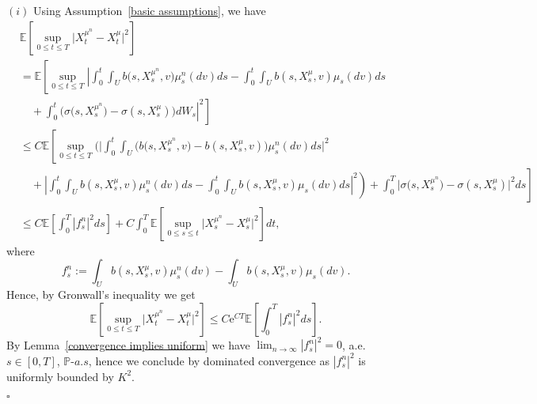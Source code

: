 \documentclass[12pt]{article}
\theoremstyle{named}
\numberwithin{equation}{section}
\def\P{{\mathord{\mathbb P}}}
\newcommand{\re}{\mathrm{e}}
\newenvironment{Proof}{\removelastskip\par\medskip \noindent{\em Proof.} \rm}{\penalty-20\null\hfill$\square$\par\medbreak}
\begin{document}
\begin{Proof}
 \noindent
 $(i)$
 Using
Assumption~\ref{basic assumptions}, we have
\begin{align*}
  &\mathbb{E}\left[ \sup\limits_{0 \leq t \leq T} \big|X^{{\mu}^n }_t - X^{{\mu}}_t\big|^2\right]
  \\
  &= \mathbb{E}\left[ \sup\limits_{0 \leq t \leq T}
    \left| \int_0^t \int_U b\big(s,X^{{\mu}^n }_s,v\big) {\mu}^n_s(dv) ds - \int_0^t \int_U b(s,X^{{\mu}}_s,v) {\mu}_s(dv) ds
      \right. \right.
      \\
      &\left.\left.
\quad       + \int_0^t \big( \sigma\big(s,X^{{\mu}^n }_s\big) - \sigma(s,X^{{\mu}}_s) \big) dW_s\right|^2\right] \\
  &\leq C \mathbb{E} \left[
    \sup\limits_{0 \leq t \leq T}\bigg(\bigg| \int_0^t \int_U \bigl( b\big(s,X^{{\mu}^n }_s,v\big) - b(s,X^{{\mu}}_s,v) \bigr) {\mu}^n _s(dv) ds\bigg|^2
    \right.
    \\
    &\left. \left.
    \quad + \left| \int_0^t \int_U b(s,X^{{\mu}}_s,v) {\mu}^n_s(dv) ds - \int_0^t \int_U b(s,X^{{\mu}}_s,v) {\mu}_s(dv) ds\right|^2\right)
    + \int_0^T \big| \sigma\big(s,X^{{\mu}^n }_s\big)- \sigma(s,X^{{\mu}}_s)\big|^2 ds\right] \\
  &\leq
  C \mathbb{E}\left[ \int_0^T |f^n _s|^2 ds \right]
   + C \int_0^T \mathbb{E}\left[ \sup\limits_{0 \leq s \leq t}\big|X^{{\mu}^n }_s - X^{{\mu}}_s\big|^2\right] dt,
\end{align*}
where
$$
f^n _s := \int_U b(s,X^{{\mu}}_s,v) {\mu}^n _s(dv)  - \int_U b(s,X^{{\mu}}_s,v) {\mu}_s(dv).
$$
Hence, by Gronwall's inequality we get
\[
\mathbb{E}\left[ \sup\limits_{0 \leq t \leq T} \big|X^{{\mu}^n }_t - X^{{\mu}}_t\big|^2\right] \leq
 C \re^{CT} \mathbb{E}\left[ \int_0^T |f^n _s|^2 ds \right].
\]
By Lemma~\ref{convergence implies uniform} we have
$\lim_{{n}\to \infty} |f^n _s|^2 = 0$, a.e. $s \in [0,T]$, $\P$-$a.s$,
hence we conclude by dominated convergence as $|f^n _s|^2$ is uniformly bounded by $K^2$.


\end{Proof}
\end{document}
